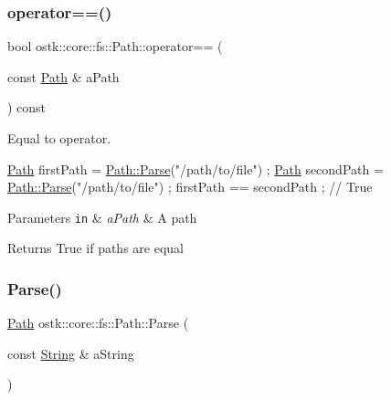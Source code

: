 \subsubsection{\texorpdfstring{operator==()}{operator==()}}
{\footnotesize\ttfamily bool ostk\+::core\+::fs\+::\+Path\+::operator== (\begin{DoxyParamCaption}\item[{const \hyperlink{classostk_1_1core_1_1fs_1_1_path}{Path} \&}]{a\+Path }\end{DoxyParamCaption}) const}



Equal to operator. 


\begin{DoxyCode}
\hyperlink{classostk_1_1core_1_1fs_1_1_path_a1a5fff28594542489223b4cfad6cc9fb}{Path} firstPath = \hyperlink{classostk_1_1core_1_1fs_1_1_path_ad08539ba654f5df11c4bcb07276345ad}{Path::Parse}(\textcolor{stringliteral}{"/path/to/file"}) ;
\hyperlink{classostk_1_1core_1_1fs_1_1_path_a1a5fff28594542489223b4cfad6cc9fb}{Path} secondPath = \hyperlink{classostk_1_1core_1_1fs_1_1_path_ad08539ba654f5df11c4bcb07276345ad}{Path::Parse}(\textcolor{stringliteral}{"/path/to/file"}) ;
firstPath == secondPath ; \textcolor{comment}{// True}
\end{DoxyCode}



\begin{DoxyParams}[1]{Parameters}
\mbox{\tt in}  & {\em a\+Path} & A path \\
\hline
\end{DoxyParams}
\begin{DoxyReturn}{Returns}
True if paths are equal 
\end{DoxyReturn}
\mbox{\label{classostk_1_1core_1_1fs_1_1_path_ad08539ba654f5df11c4bcb07276345ad}} 
\subsubsection{\texorpdfstring{Parse()}{Parse()}}
{\footnotesize\ttfamily \hyperlink{classostk_1_1core_1_1fs_1_1_path}{Path} ostk\+::core\+::fs\+::\+Path\+::\+Parse (\begin{DoxyParamCaption}\item[{const \hyperlink{classostk_1_1core_1_1types_1_1_string}{String} \&}]{a\+String }\end{DoxyParamCaption})\hspace{0.3cm}{\ttfamily [static]}}



